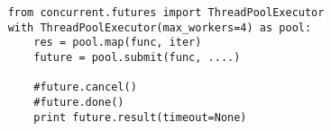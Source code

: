 \documentclass{article}
\begin{document}
{
\LARGE \vspace{15pt}
\begin{lstlisting}
	from concurrent.futures import ThreadPoolExecutor
	with ThreadPoolExecutor(max_workers=4) as pool:
		res = pool.map(func, iter)
		future = pool.submit(func, ....)

		#future.cancel()
		#future.done()
		print future.result(timeout=None)
\end{lstlisting}
}
\newpage

\newpage

\end{document}
